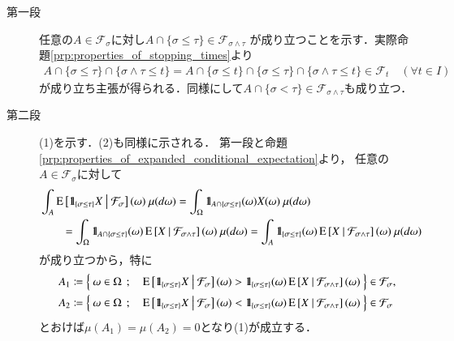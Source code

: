 	\begin{prf}\mbox{}
		\begin{description}
			\item[第一段] 
				任意の$A \in \mathcal{F}_\sigma$に対し$A \cap \{\sigma \leq \tau\} \in \mathcal{F}_{\sigma \wedge \tau}$
				が成り立つことを示す．実際命題\ref{prp:properties_of_stopping_times}より
				\begin{align}
					A \cap \{\sigma \leq \tau\} \cap \{\sigma \wedge \tau \leq t\}
					= A \cap \{\sigma \leq t\} \cap \{\sigma \leq \tau\} \cap \{\sigma \wedge \tau \leq t\}
					\in \mathcal{F}_t
					\quad (\forall t \in I)
				\end{align}
				が成り立ち主張が得られる．同様にして$A \cap \{\sigma < \tau\} \in \mathcal{F}_{\sigma \wedge \tau}$も成り立つ．
				
			\item[第二段]
				(1)を示す．(2)も同様に示される．
				第一段と命題\ref{prp:properties_of_expanded_conditional_expectation}より，
				任意の$A \in \mathcal{F}_\sigma$に対して
				\begin{align}
					&\int_A \cexp{\defunc_{\{\sigma \leq \tau\}} X}{\mathcal{F}_\sigma}(\omega)\ \mu(d\omega)
					= \int_\Omega \defunc_{A \cap \{\sigma \leq \tau\}}(\omega) X(\omega)\ \mu(d\omega) \\
					&\qquad = \int_\Omega \defunc_{A \cap \{\sigma \leq \tau\}}(\omega) \cexp{X}{\mathcal{F}_{\sigma \wedge \tau}}(\omega)\ \mu(d\omega)
					= \int_A \defunc_{\{\sigma \leq \tau\}}(\omega) \cexp{X}{\mathcal{F}_{\sigma \wedge \tau}}(\omega)\ \mu(d\omega)
				\end{align}
				が成り立つから，特に
				\begin{align}
					A_1 &\coloneqq \left\{\ \omega \in \Omega\ \, ; \quad \operatorname{E} \left[ \mbox{1}\hspace{-0.25em}\mbox{l}_{\{\sigma \leq \tau\}} X \ \middle|\ \mathcal{F}_\sigma \right](\omega) > \mbox{1}\hspace{-0.25em}\mbox{l}_{\{\sigma \leq \tau\}}(\omega) \operatorname{E} \left[ X \ \middle|\ \mathcal{F}_{\sigma \wedge \tau} \right](\omega)\ \right\} \in \mathcal{F}_\sigma, \\
					A_2 &\coloneqq \left\{\ \omega \in \Omega\ \, ; \quad \operatorname{E} \left[ \mbox{1}\hspace{-0.25em}\mbox{l}_{\{\sigma \leq \tau\}} X \ \middle|\ \mathcal{F}_\sigma \right](\omega) < \mbox{1}\hspace{-0.25em}\mbox{l}_{\{\sigma \leq \tau\}}(\omega) \operatorname{E} \left[ X \ \middle|\ \mathcal{F}_{\sigma \wedge \tau} \right](\omega)\ \right\} \in \mathcal{F}_\sigma
				\end{align}
				とおけば$\mu(A_1) = \mu(A_2) = 0$となり(1)が成立する．
				

\end{description}
\end{prf}
